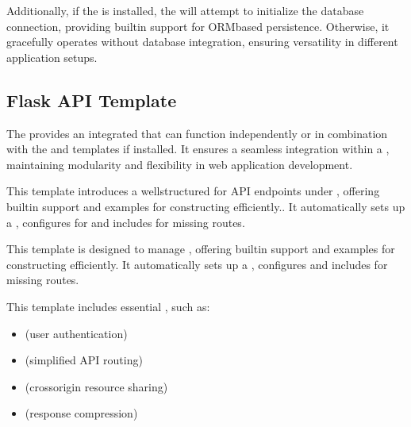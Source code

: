 \documentclass[letterpaper,10pt,english]{sphinxhowto}
\begin{document}
\sphinxAtStartPar
Additionally, if the  is installed, the  will attempt to initialize the database connection, providing built\sphinxhyphen{}in support for ORM\sphinxhyphen{}based persistence. Otherwise, it gracefully operates without database integration, ensuring versatility in different application setups.

\sphinxstepscope


\subsection{Flask API Template}
\label{\detokenize{templates/flask_api/index:flask-api-template}}\label{\detokenize{templates/flask_api/index::doc}}
\sphinxAtStartPar
The  provides an integrated  that can function independently or in combination with the  and  templates if installed. It ensures a seamless integration within a , maintaining modularity and flexibility in web application development.

\sphinxAtStartPar
This template introduces a well\sphinxhyphen{}structured  for API endpoints under , offering built\sphinxhyphen{}in support and examples for constructing  efficiently.. It automatically sets up a , configures  for  and includes  for missing routes.

\sphinxAtStartPar
This template is designed to manage , offering built\sphinxhyphen{}in support and examples for constructing  efficiently. It automatically sets up a , configures  and includes  for missing routes.

\sphinxAtStartPar
This template includes essential , such as:
\begin{itemize}
\item {} 
\sphinxAtStartPar
{} (user authentication)

\item {} 
\sphinxAtStartPar
{} (simplified API routing)

\item {} 
\sphinxAtStartPar
{} (cross\sphinxhyphen{}origin resource sharing)

\item {} 
\sphinxAtStartPar
{} (response compression)

\end{itemize}
\end{document}
